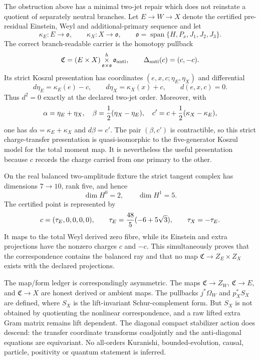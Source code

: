 \documentclass[11pt]{article}
\theoremstyle{definition}
\theoremstyle{remark}
\begin{document}
The obstruction above has a minimal two-jet repair which does not reinstate a
quotient of separately neutral branches.  Let $E\to W\to X$ denote the
certified pre-residual Einstein, Weyl and additional-primary sequence and let
\[
  \kappa_E:E\longrightarrow\mathfrak o,
  \qquad
  \kappa_X:X\longrightarrow\mathfrak o,
  \qquad
  \mathfrak o=\operatorname{span}\{H,P_x,J_1,J_2,J_3\}.
\]
The correct branch-readable carrier is the homotopy pullback
\[
 \mathfrak C
 = (E\times X)\mathop{\times}^{h}_{\mathfrak o\times\mathfrak o}
   \mathfrak o_{\rm anti},
 \qquad
 \Delta_{\rm anti}(c)=(c,-c).
\]
Its strict Koszul presentation has coordinates
$(e,x,c;\eta_E,\eta_X)$ and differential
\[
 d\eta_E=\kappa_E(e)-c,
 \qquad
 d\eta_X=\kappa_X(x)+c,
 \qquad d(e,x,c)=0.
\]
Thus $d^2=0$ exactly at the declared two-jet order.  Moreover, with
\[
 \alpha=\eta_E+\eta_X,
 \quad
 \beta={1\over2}(\eta_X-\eta_E),
 \quad
 c'=c+{1\over2}(\kappa_X-\kappa_E),
\]
one has $d\alpha=\kappa_E+\kappa_X$ and $d\beta=c'$.  The pair
$(\beta,c')$ is contractible, so this strict charge-transfer presentation is
quasi-isomorphic to the five-generator Koszul model for the total moment map.
It is nevertheless the useful presentation because $c$ records the charge
carried from one primary to the other.

On the real balanced two-amplitude fixture the strict tangent complex has
dimensions $7\to10$, rank five, and hence
\[
 \dim H^0=2,
 \qquad
 \dim H^1=5.
\]
The certified point is represented by
\[
 c=(\tau_E,0,0,0,0),
 \qquad
 \tau_E={48\over5}(-6+5\sqrt3),
 \qquad
 \tau_X=-\tau_E.
\]
It maps to the total Weyl derived zero fibre, while its Einstein and extra
projections have the nonzero charges $c$ and $-c$.  This simultaneously
proves that the correspondence contains the balanced ray and that no map
$\mathfrak C\to Z_E\times Z_X$ exists with the declared projections.

The map/form ledger is correspondingly asymmetric.  The maps
$\mathfrak C\to Z_W$, $\mathfrak C\to E$, and
$\mathfrak C\to X$ are honest derived or ambient maps.  The pullbacks
$j^*\Omega_W$ and $p_X^*S_X$ are defined, where $S_X$ is the
lift-invariant Schur-complement form.  But $S_X$ is not obtained by
quotienting the nonlinear correspondence, and a raw lifted extra Gram matrix
remains lift dependent.  The diagonal compact stabilizer action does descend:
the transfer coordinate transforms coadjointly and the anti-diagonal equations
are equivariant.  No all-orders Kuranishi, bounded-evolution, causal, particle,
positivity or quantum statement is inferred.
\end{document}
